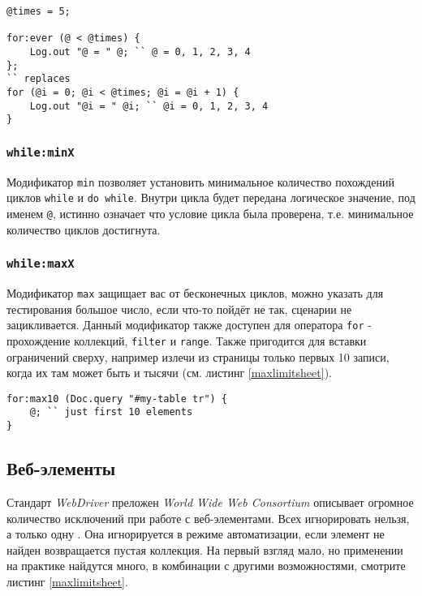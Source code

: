\begin{sourcecode}
\label{foreverloop}
\begin{verbatim}
@times = 5;

for:ever (@ < @times) {
	Log.out "@ = " @; `` @ = 0, 1, 2, 3, 4
};
`` replaces
for (@i = 0; @i < @times; @i = @i + 1) {
	Log.out "@i = " @i; `` @i = 0, 1, 2, 3, 4
}
\end{verbatim}
\end{sourcecode}

\subsubsection{\texttt{while:minX}}

Модификатор \texttt{min} позволяет установить минимальное количество похождений циклов \texttt{while} и \texttt{do while}. Внутри цикла будет передана логическое значение, под именем \texttt{@}, истинно означает что условие цикла была проверена, т.е. минимальное количество циклов достигнута.

\subsubsection{\texttt{while:maxX}}

Модификатор \texttt{max} защищает вас от бесконечных циклов, можно указать для тестирования большое число, если что-то пойдёт не так, сценарии не зацикливается. Данный модификатор также доступен для оператора \texttt{for} - прохождение коллекций, \texttt{filter} и \texttt{range}. Также пригодится для вставки ограничений сверху, например излечи из страницы только первых 10 записи, когда их там может быть и тысячи (см. листинг \ref{maxlimitsheet}).

\begin{sourcecode}
\label{maxlimitsheet}
\begin{verbatim}
for:max10 (Doc.query "#my-table tr") {
	@; `` just first 10 elements
}
\end{verbatim}
\end{sourcecode}

\subsection{Веб-элементы}

Стандарт \textit{WebDriver} преложен \textit{World Wide Web Consortium} описывает огромное количество исключений при работе с веб-элементами. Всех игнорировать нельзя, а только одну . Она игнорируется в режиме автоматизации, если элемент не найден возвращается пустая коллекция. На первый взгляд мало, но применении на практике найдутся много, в комбинации с другими возможностями, смотрите листинг \ref{maxlimitsheet}.

